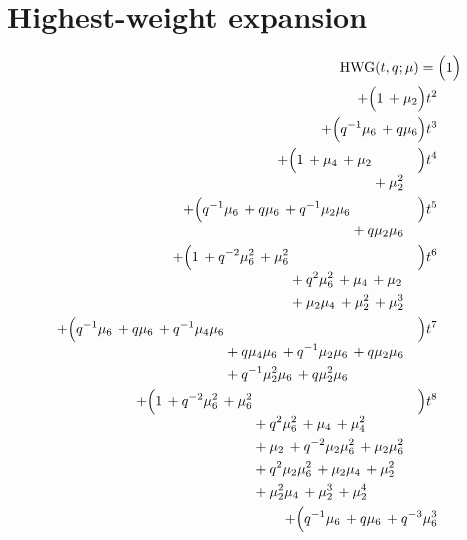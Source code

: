 \documentclass[10pt]{article}
\begin{document}
\section{Highest-weight expansion}
\[
\begin{aligned}
\mathrm{HWG}(t,q;\mu) ={}&
   \Bigl(1\Bigr) \\
  + \Bigl(1\,+\mu_{2}\Bigr)t^{2} \\
  + \Bigl(q^{-1}\mu_{6}\,+q\mu_{6}\Bigr)t^{3} \\
  + \Bigl(\begin{aligned}[t]1\,+\mu_{4}\,+\mu_{2} \\
  &{}+\mu_{2}^{2}\end{aligned}\Bigr)t^{4} \\
  + \Bigl(\begin{aligned}[t]q^{-1}\mu_{6}\,+q\mu_{6}\,+q^{-1}\mu_{2}\mu_{6} \\
  &{}+q\mu_{2}\mu_{6}\end{aligned}\Bigr)t^{5} \\
  + \Bigl(\begin{aligned}[t]1\,+q^{-2}\mu_{6}^{2}\,+\mu_{6}^{2} \\
  &{}+q^{2}\mu_{6}^{2}\,+\mu_{4}\,+\mu_{2} \\
  &{}+\mu_{2}\mu_{4}\,+\mu_{2}^{2}\,+\mu_{2}^{3}\end{aligned}\Bigr)t^{6} \\
  + \Bigl(\begin{aligned}[t]q^{-1}\mu_{6}\,+q\mu_{6}\,+q^{-1}\mu_{4}\mu_{6} \\
  &{}+q\mu_{4}\mu_{6}\,+q^{-1}\mu_{2}\mu_{6}\,+q\mu_{2}\mu_{6} \\
  &{}+q^{-1}\mu_{2}^{2}\mu_{6}\,+q\mu_{2}^{2}\mu_{6}\end{aligned}\Bigr)t^{7} \\
  + \Bigl(\begin{aligned}[t]1\,+q^{-2}\mu_{6}^{2}\,+\mu_{6}^{2} \\
  &{}+q^{2}\mu_{6}^{2}\,+\mu_{4}\,+\mu_{4}^{2} \\
  &{}+\mu_{2}\,+q^{-2}\mu_{2}\mu_{6}^{2}\,+\mu_{2}\mu_{6}^{2} \\
  &{}+q^{2}\mu_{2}\mu_{6}^{2}\,+\mu_{2}\mu_{4}\,+\mu_{2}^{2} \\
  &{}+\mu_{2}^{2}\mu_{4}\,+\mu_{2}^{3}\,+\mu_{2}^{4}\end{aligned}\Bigr)t^{8} \\
  + \Bigl(\begin{aligned}[t]q^{-1}\mu_{6}\,+q\mu_{6}\,+q^{-3}\mu_{6}^{3} \\

\end{aligned}
\end{aligned}\]
\end{document}
